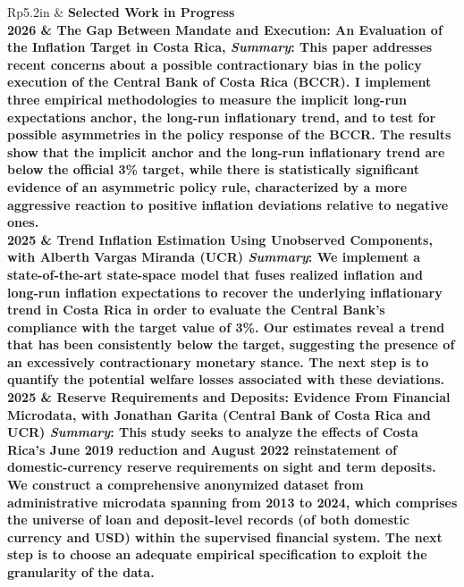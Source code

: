 \documentclass[letterpaper, 11pt]{article}
\newcommand{\headingfont}{\bfseries\Large\color{ChadDarkBlue}}
\newenvironment{SectionTable}[1]{
	\renewcommand*{\arraystretch}{1.7}
	\setlength{\tabcolsep}{10pt}
	\begin{longtable}{Rp{5.2in}} & #1 \\}
{\end{longtable}\vspace{-1cm}}
\begin{document}
\begin{SectionTable}{\headingfont Selected Work in Progress} 
2026 & 
\textbf{The Gap Between Mandate and Execution: An Evaluation of the Inflation Target in Costa Rica}, \vspace{2mm} \newline 
\small \textit{Summary}: This paper addresses recent concerns about a possible contractionary bias in the policy execution of the Central Bank of Costa Rica (BCCR). I implement three empirical methodologies to measure the implicit long-run expectations anchor, the long-run inflationary trend, and to test for possible asymmetries in the policy response of the BCCR. The results show that the implicit anchor and the long-run inflationary trend are below the official 3\% target, while there is statistically significant evidence of an asymmetric policy rule, characterized by a more aggressive reaction to positive inflation deviations relative to negative ones. \\

2025 & 
\textbf{Trend Inflation Estimation Using Unobserved Components}, with Alberth Vargas Miranda (UCR) \vspace{2mm} \newline 
\small \textit{Summary}: We implement a state-of-the-art state-space model that fuses realized inflation and long-run inflation expectations to recover the underlying inflationary trend in Costa Rica in order to evaluate the Central Bank's compliance with the target value of 3\%. Our estimates reveal a trend that has been consistently below the target, suggesting the presence of an excessively contractionary monetary stance. The next step is to quantify the potential welfare losses associated with these deviations. \\

2025 & 
\textbf{Reserve Requirements and Deposits: Evidence From Financial Microdata}, with Jonathan Garita (Central Bank of Costa Rica and UCR) \vspace{2mm} \newline
\small \textit{Summary}: This study seeks to analyze the effects of Costa Rica’s June 2019 reduction and August 2022 reinstatement of domestic-currency reserve requirements on sight and term deposits. We construct a comprehensive anonymized dataset from administrative microdata spanning from 2013 to 2024, which comprises the universe of loan and deposit-level records (of both domestic currency and USD) within the supervised financial system. The next step is to choose an adequate empirical specification to exploit the granularity of the data. \\


\end{SectionTable}
\end{document}
